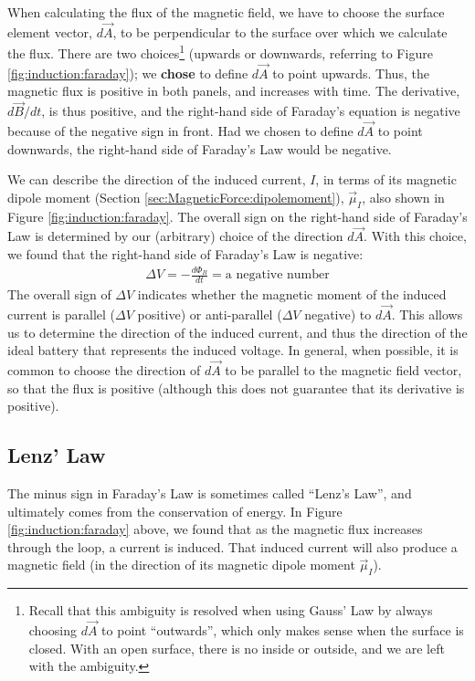 When calculating the flux of the magnetic field, we have to choose the surface element vector, $d\vec A$, to be perpendicular to the surface over which we calculate the flux. There are two choices\footnote{Recall that this ambiguity is resolved when using Gauss' Law by always choosing $d\vec A$ to point ``outwards'', which only makes sense when the surface is closed. With an open surface, there is no inside or outside, and we are left with the ambiguity.} (upwards or downwards, referring to Figure \ref{fig:induction:faraday}); we \textbf{chose} to define $d\vec A$ to point upwards. Thus, the magnetic flux is positive in both panels, and increases with time. The derivative, $d\vec B/dt$, is thus positive, and the right-hand side of Faraday's equation is negative because of the negative sign in front. Had we chosen to define $d\vec A$ to point downwards, the right-hand side of Faraday's Law would be negative.

We can describe the direction of the induced current, $I$, in terms of its magnetic dipole moment (Section \ref{sec:MagneticForce:dipolemoment}), $\vec\mu_I$, also shown in Figure \ref{fig:induction:faraday}. The overall sign on the right-hand side of Faraday's Law is determined by our (arbitrary) choice of the direction $d\vec A$. With this choice, we found that the right-hand side of Faraday's Law is negative:
\begin{align*}
\Delta V = -\frac{d\Phi_B}{dt}=\text{a negative number}
\end{align*}
The overall sign of $\Delta V$ indicates whether the magnetic moment of the induced current is parallel ($\Delta V$ positive) or anti-parallel ($\Delta V$ negative) to $d\vec A$. This allows us to determine the direction of the induced current, and thus the direction of the ideal battery that represents the induced voltage. In general, when possible, it is common to choose the direction of $d\vec A$ to be parallel to the magnetic field vector, so that the flux is positive (although this does not guarantee that its derivative is positive).

\subsection{Lenz' Law}
The minus sign in Faraday's Law is sometimes called ``Lenz's Law'', and ultimately comes from the conservation of energy. In Figure \ref{fig:induction:faraday} above, we found that as the magnetic flux increases through the loop, a current is induced. That induced current will also produce a magnetic field (in the direction of its magnetic dipole moment $\vec \mu_I$).

